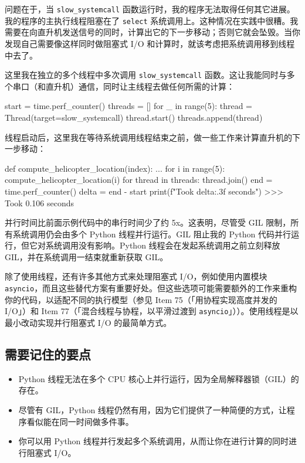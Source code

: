 问题在于，当 \texttt{slow\_systemcall} 函数运行时，我的程序无法取得任何其它进展。我的程序的主执行线程阻塞在了 \texttt{select} 系统调用上。这种情况在实践中很糟。我需要在向直升机发送信号的同时，计算出它的下一步移动；否则它就会坠毁。当你发现自己需要像这样同时做阻塞式 I/O 和计算时，就该考虑把系统调用移到线程中去了。

这里我在独立的多个线程中多次调用 \texttt{slow\_systemcall} 函数。这让我能同时与多个串口（和直升机）通信，同时让主线程去做任何所需的计算：

\begin{codebox}[python]
start = time.perf_counter()
threads = []
for _ in range(5):
    thread = Thread(target=slow_systemcall)
    thread.start()
    threads.append(thread)
\end{codebox}

线程启动后，这里我在等待系统调用线程结束之前，做一些工作来计算直升机的下一步移动：

\begin{codebox}[python]
def compute_helicopter_location(index):
    ...
for i in range(5):
    compute_helicopter_location(i)
for thread in threads:
    thread.join()
end = time.perf_counter()
delta = end - start
print(f"Took {delta:.3f} seconds")
>>>
Took 0.106 seconds
\end{codebox}

并行时间比前面示例代码中的串行时间少了约 5x。这表明，尽管受 GIL 限制，所有系统调用仍会由多个 Python 线程并行运行。GIL 阻止我的 Python 代码并行运行，但它对系统调用没有影响。Python 线程会在发起系统调用之前立刻释放 GIL，并在系统调用一结束就重新获取 GIL。

除了使用线程，还有许多其他方式来处理阻塞式 I/O，例如使用内置模块 \texttt{asyncio}，而且这些替代方案有重要好处。但这些选项可能需要额外的工作来重构你的代码，以适配不同的执行模型（参见 Item 75（「用协程实现高度并发的 I/O」）和 Item 77（「混合线程与协程，以平滑过渡到 \texttt{asyncio}」））。使用线程是以最小改动实现并行阻塞式 I/O 的最简单方式。

\subsection{需要记住的要点}

\begin{itemize}
\item Python 线程无法在多个 CPU 核心上并行运行，因为全局解释器锁（GIL）的存在。
\item 尽管有 GIL，Python 线程仍然有用，因为它们提供了一种简便的方式，让程序看似能在同一时间做多件事。
\item 你可以用 Python 线程并行发起多个系统调用，从而让你在进行计算的同时进行阻塞式 I/O。
\end{itemize}

